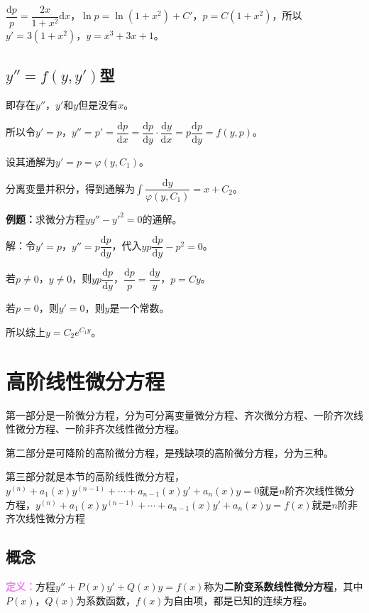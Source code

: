 \documentclass[UTF8, 12pt]{ctexart}
\begin{document}
        $\dfrac{\textrm{d}p}{p}=\dfrac{2x}{1+x^2}\textrm{d}x$，$\ln p=\ln(1+x^2)+C'$，$p=C(1+x^2)$，所以$y'=3(1+x^2)$，$y=x^3+3x+1$。

        \subsection{\texorpdfstring{$y''=f(y,y')$}\ 型}

        即存在$y''$，$y'$和$y$但是没有$x$。

        所以令$y'=p$，$y''=p'=\dfrac{\textrm{d}p}{\textrm{d}x}=\dfrac{\textrm{d}p}{\textrm{d}y}\cdot\dfrac{\textrm{d}y}{\textrm{d}x}=p\dfrac{\textrm{d}p}{\textrm{d}y}=f(y,p)$。

        设其通解为$y'=p=\varphi(y,C_1)$。

        分离变量并积分，得到通解为$\displaystyle{\int\dfrac{\textrm{d}y}{\varphi(y,C_1)}=x+C_2}$。

        \textbf{例题：}求微分方程$yy''-y'^2=0$的通解。

        解：令$y'=p$，$y''=p\dfrac{\textrm{d}p}{\textrm{d}y}$，代入$yp\dfrac{\textrm{d}p}{\textrm{d}y}-p^2=0$。

        若$p\neq0$，$y\neq0$，则$yp\dfrac{\textrm{d}p}{\textrm{d}y}$，$\dfrac{\textrm{d}p}{p}=\dfrac{\textrm{d}y}{y}$，$p=Cy$。

        若$p=0$，则$y'=0$，则$y$是一个常数。

        所以综上$y=C_2e^{C_1y}$。

        \section{高阶线性微分方程}

        第一部分是一阶微分方程，分为可分离变量微分方程、齐次微分方程、一阶齐次线性微分方程、一阶非齐次线性微分方程。

        第二部分是可降阶的高阶微分方程，是残缺项的高阶微分方程，分为三种。

        第三部分就是本节的高阶线性微分方程，$y^{(n)}+a_1(x)y^{(n-1)}+\cdots+a_{n-1}(x)y'+a_n(x)y=0$就是$n$阶齐次线性微分方程，$y^{(n)}+a_1(x)y^{(n-1)}+\cdots+a_{n-1}(x)y'+a_n(x)y=f(x)$就是$n$阶非齐次线性微分方程

        \subsection{概念}

        \textcolor{violet}{\textbf{定义：}}方程$y''+P(x)y'+Q(x)y=f(x)$称为\textbf{二阶变系数线性微分方程}，其中$P(x)$，$Q(x)$为系数函数，$f(x)$为自由项，都是已知的连续方程。
\end{document}
